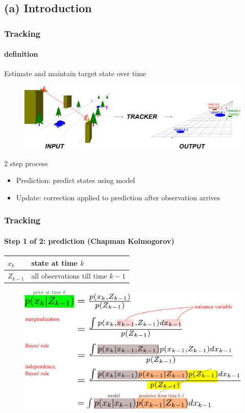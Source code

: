 \subsection{(a) Introduction}
\begin{frame}
\frametitle{Tracking}
\framesubtitle{definition}
\logoCSIPCPL\mypagenum
	Estimate and maintain {\color{red}target state} over {\color{red}time}
	\begin{figure}
		\includegraphics[width=1.0\textwidth]{thesis/TRK_overviewDiagram.pdf}
	\end{figure}
	\vspace{0.2in}
	2 step process
	\begin{itemize}
	\item Prediction: predict states using model
	\item Update: correction applied to prediction after observation arrives
	\end{itemize}
\end{frame}



\begin{frame}
\frametitle{Tracking}
\framesubtitle{Step 1 of 2: prediction (Chapman Kolmogorov)}
\logoCSIPCPL\mypagenum
\begin{table}
\begin{tabular}{|l|l|}\hline
$x_k$ & state at time $k$\\\hline
$Z_{k-1}$ &  all observations till time $k-1$\\\hline
\end{tabular}
\end{table}
\begin{figure}
\includegraphics[width=1.0\textwidth]{thesis/TRK_EQN_prediction.pdf}
\end{figure}
\end{frame}


